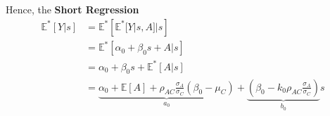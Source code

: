 \documentclass[11pt]{elegantbook}
\begin{document}
\begin{enumerate}
    Hence, the \textbf{Short Regression}
    \begin{equation}
        \begin{aligned}
            \mathbb{E}^*[Y|s]&=\mathbb{E}^*\left[\mathbb{E}^*[Y|s,A]|s\right]\\
            &=\mathbb{E}^*\left[\alpha_0+\beta_0s+A|s\right]\\
            &=\alpha_0+\beta_0s+\mathbb{E}^*[A|s]\\
            &=\underbrace{\alpha_0+\mathbb{E}[A]+\rho_{AC}\frac{\sigma_A}{\sigma_C}(\beta_0-\mu_C)}_{a_0}+\underbrace{\left(\beta_0-k_0\rho_{AC}\frac{\sigma_A}{\sigma_C}\right)}_{b_0}s
        \end{aligned}
        \tag{SR}
        \label{SR}
    \end{equation}
\end{enumerate}
\end{document}
